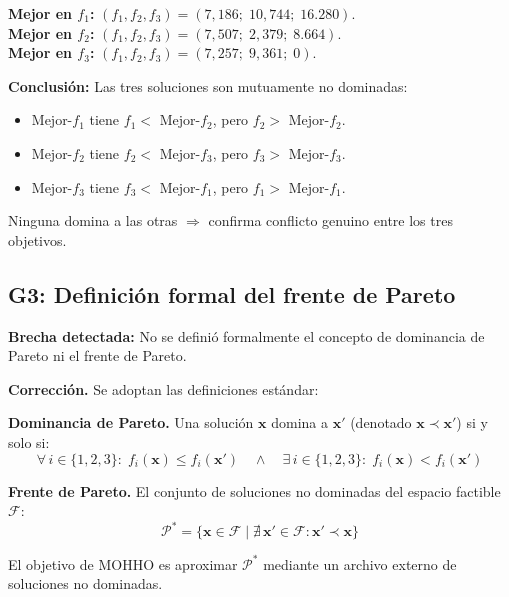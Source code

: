 \documentclass[12pt,letterpaper]{article}
\begin{document}
\begin{examplebox}
\textbf{Mejor en $f_1$:} $(f_1, f_2, f_3) = (7{,}186;\; 10{,}744;\; 16.280)$.\\
\textbf{Mejor en $f_2$:} $(f_1, f_2, f_3) = (7{,}507;\; 2{,}379;\; 8.664)$.\\
\textbf{Mejor en $f_3$:} $(f_1, f_2, f_3) = (7{,}257;\; 9{,}361;\; 0)$.

\textbf{Conclusión:} Las tres soluciones son mutuamente no dominadas:
\begin{itemize}
    \item Mejor-$f_1$ tiene $f_1 < $ Mejor-$f_2$, pero $f_2 > $ Mejor-$f_2$.
    \item Mejor-$f_2$ tiene $f_2 < $ Mejor-$f_3$, pero $f_3 > $ Mejor-$f_3$.
    \item Mejor-$f_3$ tiene $f_3 < $ Mejor-$f_1$, pero $f_1 > $ Mejor-$f_1$.
\end{itemize}
Ninguna domina a las otras $\Rightarrow$ confirma conflicto genuino entre los tres objetivos. 
\end{examplebox}

\subsection{G3: Definición formal del frente de Pareto}

\begin{notebox}
\textbf{Brecha detectada:} No se definió formalmente el concepto de dominancia de Pareto ni el frente de Pareto.
\end{notebox}

\textbf{Corrección.} Se adoptan las definiciones estándar:

\begin{formulabox}
\textbf{Dominancia de Pareto.} Una solución $\mathbf{x}$ domina a $\mathbf{x}'$ (denotado $\mathbf{x} \prec \mathbf{x}'$) si y solo si:
\[
\forall\, i \in \{1,2,3\}:\; f_i(\mathbf{x}) \leq f_i(\mathbf{x}') \quad \wedge \quad \exists\, i \in \{1,2,3\}:\; f_i(\mathbf{x}) < f_i(\mathbf{x}')
\]

\textbf{Frente de Pareto.} El conjunto de soluciones no dominadas del espacio factible $\mathcal{F}$:
\[
\mathcal{P}^* = \bigl\{\mathbf{x} \in \mathcal{F} \;\big|\; \nexists\, \mathbf{x}' \in \mathcal{F} : \mathbf{x}' \prec \mathbf{x}\bigr\}
\]
\end{formulabox}

El objetivo de MOHHO es aproximar $\mathcal{P}^*$ mediante un archivo externo de soluciones no dominadas.
\end{document}
